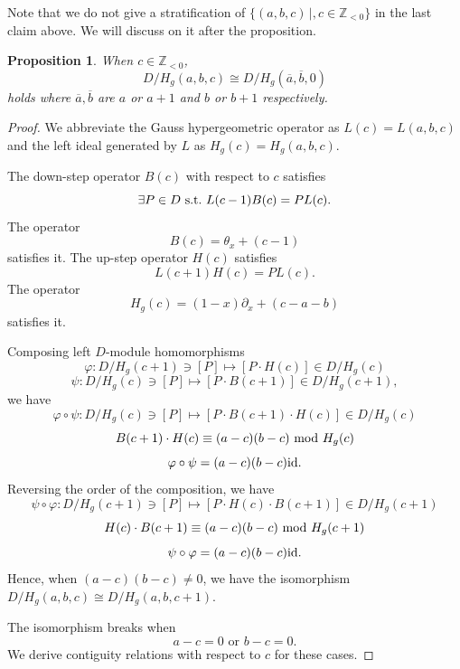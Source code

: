 \documentclass{article}
\def\p{\partial}
\def\aalpha{a}
\def\bbeta{b}
\def\ggamma{c}
\def\Hg{H_g}
\newtheorem{proposition}{Proposition}
\begin{document}
Note that we do not give a stratification of 
$\{(\aalpha,\bbeta,\ggamma)\,|, \ggamma \in \mathbb{Z}_{<0}\}$
in the last claim above.
We will discuss on it after the proposition.

\begin{proposition} \label{prop:c-isom-gauss-hg}
When $\ggamma \in \mathbb{Z}_{< 0}$,
$$D/\Hg(\aalpha, \bbeta, \ggamma) \cong D/\Hg(\overline{\aalpha}, \overline{\bbeta}, 0)$$ 
holds
where 
$\overline{\aalpha}, \overline{\bbeta}$ are 
$\aalpha$ or $\aalpha+1$ and $\bbeta$ or $\bbeta+1$ respectively.
\end{proposition}

\begin{proof}
We abbreviate the Gauss hypergeometric operator as
$L(\ggamma) = L(\aalpha, \bbeta, \ggamma)$
and the left ideal generated by $L$ as 
$\Hg(\ggamma) = \Hg(\aalpha, \bbeta, \ggamma)$. 

The down-step operator $B(\ggamma)$ with respect to $\ggamma$
satisfies
$$\exists P \in D ~{\rm s.t.}~ L(\ggamma-1) B(\ggamma) = P L(\ggamma). $$
The operator
$$
B(\ggamma) = \theta_x +  (\ggamma - 1)
$$
satisfies it.
The up-step operator $H(\ggamma)$ satisfies 
$$L(\ggamma+1) H(\ggamma) = P L(\ggamma).$$
The operator
$$
\Hg(\ggamma) =  (1-x) \p_x + (\ggamma-\aalpha-\bbeta)
$$
satisfies it.

Composing left $D$-module homomorphisms
$$
\varphi : D/\Hg(\ggamma+1) \ni [P] \mapsto [P \cdot H(\ggamma)] \in D/\Hg(\ggamma)
$$
$$
\psi : D/\Hg(\ggamma) \ni [P] \mapsto [P \cdot B(\ggamma+1)] \in D/\Hg(\ggamma+1),
$$
we have
$$
\varphi \circ \psi : D/\Hg(\ggamma) \ni [P] \mapsto [P \cdot B(\ggamma+1) \cdot H(\ggamma)] \in D/\Hg(\ggamma)
$$ 
$$
B(\ggamma+1) \cdot H(\ggamma) \equiv (\aalpha-\ggamma)(\bbeta-\ggamma) ~{\rm mod}~  \Hg(\ggamma)
$$
$$
\varphi \circ \psi = (\aalpha-\ggamma)(\bbeta-\ggamma) {\rm id}.
$$
Reversing the order of the composition,
we have
$$
\psi \circ \varphi : D/\Hg(\ggamma+1) \ni [P] \mapsto [P \cdot H(\ggamma) \cdot B(\ggamma+1)] \in D/\Hg(\ggamma+1)
$$
$$
H(\ggamma) \cdot B(\ggamma + 1) \equiv (\aalpha-\ggamma)(\bbeta-\ggamma) ~{\rm mod}~  \Hg(\ggamma+1)
$$
$$
\psi \circ \varphi  = (\aalpha-\ggamma)(\bbeta-\ggamma)  {\rm id}. 
$$
Hence, when 
$(\aalpha - \ggamma)(\bbeta - \ggamma) \neq 0$,
we have the isomorphism 
$
D/\Hg(\aalpha, \bbeta, \ggamma) \cong D/\Hg(\aalpha, \bbeta, \ggamma+1)
$.

The isomorphism breaks when
$$\aalpha - \ggamma = 0 \text{ or } \bbeta - \ggamma = 0.$$
We derive contiguity relations with respect to $\ggamma$ 
for these cases.


\end{proof}
\end{document}
